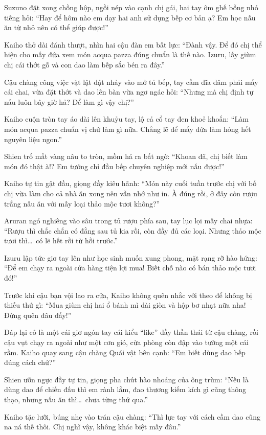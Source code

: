 \documentclass[../main.tex]{subfiles}
\begin{document}
Suzuno đặt xong chồng hộp, ngồi nép vào cạnh chị gái, hai tay ôm ghế bỗng nhỏ tiếng hỏi: ``Hay để hôm nào em dạy hai anh sử dụng bếp cơ bản ạ? Em học nấu ăn từ nhỏ nên có thể giúp được!''

Kaiho thở dài đánh thượt, nhìn hai cậu đàn em bất lực: ``Đành vậy. Để đó chị thể hiện cho mấy đứa xem món acqua pazza đúng chuẩn là thế nào. Izuru, lấy giùm chị cái thớt gỗ và con dao làm bếp sắc bén ra đây.''

Cậu chàng công việc vặt lật đật nhảy vào mở tủ bếp, tay cầm đĩa đâm phải mấy cái chai, vừa đặt thớt và dao lên bàn vừa ngơ ngác hỏi: ``Nhưng mà chị định tự nấu luôn bây giờ hả? Để làm gì vậy chị?''

Kaiho cuộn tròn tay áo dài lên khuỷu tay, lộ cả cổ tay đen khoẻ khoắn: ``Làm món acqua pazza chuẩn vị chứ làm gì nữa. Chẳng lẽ để mấy đứa làm hỏng hết nguyên liệu ngon.''

Shien trố mắt vàng nâu to tròn, mồm há ra bất ngờ: ``Khoan đã, chị biết làm món đó thật à!? Em tưởng chỉ đầu bếp chuyên nghiệp mới nấu được!''

Kaiho tự tin gật đầu, giọng đầy kiêu hãnh: ``Món này cuối tuần trước chị với bố chị vừa làm cho cả nhà ăn xong nên vẫn nhớ như in. À đúng rồi, ở đây còn rượu trắng nấu ăn với mấy loại thảo mộc tươi không?''

Aruran ngó nghiêng vào sâu trong tủ rượu phía sau, tay lục lọi mấy chai nhựa: ``Rượu thì chắc chắn có đằng sau tủ kia rồi, còn đầy đủ các loại. Nhưng thảo mộc tươi thì\dots\ có lẽ hết rồi từ hồi trước.''

Izuru lập tức giơ tay lên như học sinh muốn xung phong, mặt rạng rỡ hào hứng: ``Để em chạy ra ngoài cửa hàng tiện lợi mua! Biết chỗ nào có bán thảo mộc tươi đó!''

Trước khi cậu bạn vội lao ra cửa, Kaiho không quên nhắc với theo để không bị thiếu thứ gì: ``Mua giùm chị hai ổ bánh mì dài giòn và hộp bơ nhạt nữa nha! Đừng quên đâu đấy!''

Đáp lại cô là một cái giơ ngón tay cái kiểu ``like'' đầy thần thái từ cậu chàng, rồi cậu vụt chạy ra ngoài như một cơn gió, cửa phòng còn đập vào tường một cái rầm. Kaiho quay sang cậu chàng Quái vật bên cạnh: ``Em biết dùng dao bếp đúng cách chứ?''

Shien ưỡn ngực đầy tự tin, giọng pha chút hào nhoáng của ông trùm: ``Nếu là dùng dao để chiến đấu thì em rành lắm, đao thương kiếm kích gì cũng thông thạo, nhưng nấu ăn thì\dots\ chưa từng thử qua.''

Kaiho tặc lưỡi, búng nhẹ vào trán cậu chàng: ``Thì lực tay với cách cầm dao cũng na ná thế thôi. Chị nghĩ vậy, không khác biệt mấy đâu.''
\end{document}
